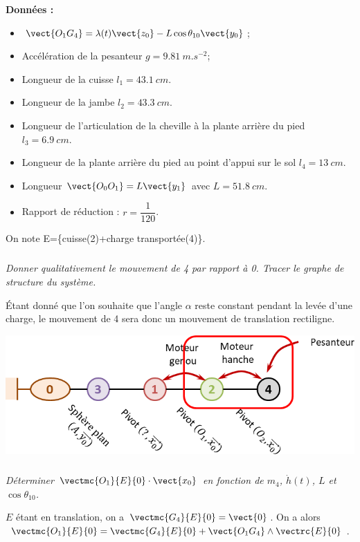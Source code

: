 \begin{multicols}{2}
\noindent\textbf{Données :}
\begin{itemize}
\item $\vect{O_1G_4}=\lambda(t)\vect{z_0}-L\cos\theta_{10}\vect{y_0}$;
\item Accélération de la pesanteur $g=\SI{9,81}{m.s^{-2}}$;
\item Longueur de la cuisse $l_1 = \SI{43,1}{cm}$.
\item Longueur de la jambe $l_2 = \SI{43,3}{cm}$.
\item Longueur de l'articulation de la cheville à la plante arrière du pied $l_3 = \SI{6,9}{cm}$.
\item Longueur de la plante arrière du pied au point d’appui sur le sol $l_4 = \SI{13}{cm}$.
\item Longueur $\vect{O_0O_1}=L\vect{y_1}$ avec $L=\SI{51,8}{cm}$.
\item Rapport de réduction : $r=\dfrac{1}{120}$.
\end{itemize}

On note E=\{cuisse(2)+charge transportée(4)\}. 

\fi

\subparagraph{} \textit{Donner qualitativement le mouvement de 4 par rapport à 0. Tracer le graphe de structure du système.}

\ifprof
\begin{corrige}
Étant donné que l'on souhaite que l'angle $\alpha$ reste constant pendant la levée d'une charge, le mouvement de 4 sera donc un mouvement de translation rectiligne.  

\begin{center}
\includegraphics[width=.7\linewidth]{images/cor_00}
\end{center}
\end{corrige}
\else
\fi


\subparagraph{} \textit{Déterminer $\vectmc{O_1}{E}{0}\cdot \vect{x_0}$ en fonction de $m_4$, $\dot{h}(t)$, $L$ et $\cos\theta_{10}$.}

\ifprof
\begin{corrige}
$E$ étant en translation, on a $\vectmc{G_4}{E}{0}=\vect{0}$. On a alors 
 $\vectmc{O_1}{E}{0}=\vectmc{G_4}{E}{0}+\vect{O_1G_4}\wedge\vectrc{E}{0}$.


\end{corrige}
\end{multicols}
